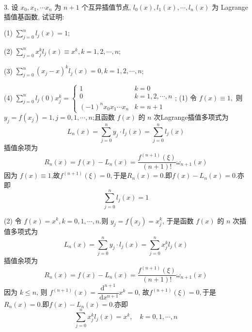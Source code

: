 \begin{tcolorbox}[breakable,enhanced,arc=0mm,outer arc=0mm,
		boxrule=0pt,toprule=1pt,leftrule=0pt,bottomrule=1pt, rightrule=0pt,left=0.2cm,right=0.2cm,
		titlerule=0.5em,toptitle=0.1cm,bottomtitle=-0.1cm,top=0.2cm,
		colframe=white!10!biru,colback=white!90!biru,coltitle=white,
            coltext=black,title =2024-03-10, title style={white!10!biru}, before skip=8pt, after skip=8pt,before upper=\hspace{2em},
		fonttitle=\bfseries,fontupper=\normalsize]
  
3. 设 $ x_{0}, x_{1}, \cdots x_{n} $ 为 $ n+1 $ 个互异插值节点, $ {l}_{{0}}({x}), {l}_{{1}}({x}), \cdots, {l}_{{n}}({x}) $ 为 Lagrange 插值基函数, 试证明:

(1) $ \sum\limits_{j=0}^{n} l_{j}(x)=1 $;

(2) $ \sum\limits_{j=0}^{n} x_{j}^{k} l_{j}(x) \equiv x^{k}, k=1,2, \cdots, n $;

(3) $ \sum\limits_{j=0}^{n}\left(x_{j}-x\right)^{k} l_{j}(x)=0, k=1,2, \cdots, n $;

(4) $ \sum\limits_{j=0}^{n} l_{j}(0) x_{j}^{k}=\left\{\begin{array}{ll}1 & k=0 \\ 0 & k=1,2, \cdots, n \\ (-1)^{n} x_{0} x_{1} \cdots x_{n} & k=n+1\end{array}\right. $;
 \tcblower
(1) 令 $ f(x)\equiv1,$ 则 $ y_{j}=f\left(x_{j}\right)=1, j=0,1, \cdots, n $;且函数 $ f(x) $ 的 $ n $ 次Lagrange插值多项式为
$$
L_{n}(x)=\sum_{j=0}^{n}  y_j \cdot l_{j}(x)=\sum_{j=0}^{n}   l_{j}(x)
$$
插值余项为
$$
R_{n}(x)=f(x)-L_{n}(x)=\frac{f^{(n+1)}(\xi)}{(n+1) !}  \omega_{n+1}(x)
$$
因为 $f(x)\equiv 1$,故$f^{(n+1)}(\xi)=0,$于是$R_{n}(x)=0 .$即$f(x)-L_{n}(x)=0$.亦即
$$
\sum_{j=0}^{n}  l_{j}(x)=1
$$

(2) 令 $ f(x)=x^{k}, k=0,1, \cdots, n $.则 $ y_{j}=f\left(x_{j}\right)=x_j^k$,  于是函数 $ f(x) $ 的 $ n $ 次插值多项式为
$$
L_{n}(x)=\sum_{j=0}^{n}  y_j \cdot l_{j}(x)=\sum_{j=0}^{n} x_{j}^{k} l_{j}(x)
$$
插值余项为
$$
R_{n}(x)=f(x)-L_{n}(x)=\frac{f^{(n+1)}(\xi)}{(n+1) !}  \omega_{n+1}(x)
$$
因为 $ k \leqslant n $, 则 $ f^{(n+1)}(x)=\dfrac{\mathrm{d}^{n+1}}{\mathrm{~d} x^{n+1}} x^{k}=0 $,
故$f^{(n+1)}(\xi)=0,$于是$R_{n}(x)=0 .$即$f(x)-L_{n}(x)=0$.亦即
$$
\sum_{j=0}^{n} x_{j}^{k} l_{j}(x)=x^{k}, \quad k=0,1, \cdots, n
$$


\end{tcolorbox}
